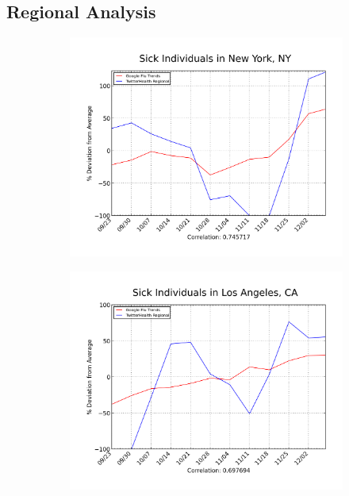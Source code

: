 \documentclass[11pt, letterpaper]{article}
\begin{document}
        \subsection{Regional Analysis}
            \begin{figure}[t!]
                \begin{center}
                    \begin{subfigure}[t]{0.45\textwidth}
                        \includegraphics[width=\textwidth]{../plot/figures/NYC_mob_2012-12-15.png}
                    \end{subfigure}
                    \begin{subfigure}[t]{0.45\textwidth}
                        \includegraphics[width=\textwidth]{../plot/figures/LA_mob_2012-12-15.png}

\end{subfigure}
\end{center}
\end{figure}
\end{document}
